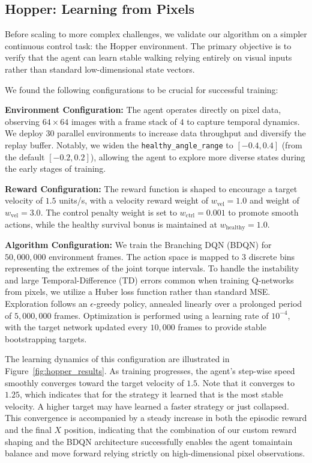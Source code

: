 \subsection{Hopper: Learning from Pixels}
\label{sec:hopper_results}

Before scaling to more complex challenges, we validate our algorithm on a simpler continuous control task: the Hopper environment. The primary objective is to verify that the agent can learn stable walking relying entirely on visual inputs rather than standard low-dimensional state vectors. 

We found the following configurations to be crucial for successful training:

\textbf{Environment Configuration:} 
The agent operates directly on pixel data, observing $64 \times 64$ images with a frame stack of $4$ to capture temporal dynamics. We deploy $30$ parallel environments to increase data throughput and diversify the replay buffer. Notably, we widen the \texttt{healthy\_angle\_range} to $[-0.4, 0.4]$ (from the default $[-0.2, 0.2]$), allowing the agent to explore more diverse states during the early stages of training.

\textbf{Reward Configuration:}
The reward function is shaped to encourage a target velocity of $1.5$ units/s, with a velocity reward weight of $w_{\text{vel}} = 1.0$ and weight of $w_{\text{vel}} = 3.0$. The control penalty weight is set to $w_{\text{ctrl}} = 0.001$ to promote smooth actions, while the healthy survival bonus is maintained at $w_{\text{healthy}} = 1.0$.

\textbf{Algorithm Configuration:} 
We train the Branching DQN (BDQN) for $50,000,000$ environment frames. The action space is mapped to $3$ discrete bins representing the extremes of the joint torque intervals. To handle the instability and large Temporal-Difference (TD) errors common when training Q-networks from pixels, we utilize a Huber loss function rather than standard MSE. Exploration follows an $\epsilon$-greedy policy, annealed linearly over a prolonged period of $5,000,000$ frames. Optimization is performed using a learning rate of $10^{-4}$, with the target network updated every $10,000$ frames to provide stable bootstrapping targets.

The learning dynamics of this configuration are illustrated in Figure~\ref{fig:hopper_results}. As training progresses, the agent's step-wise speed smoothly converges toward the target velocity of $1.5$. Note that it converges to $1.25$, which indicates that for the strategy it learned that is the most stable velocity. A higher target may have learned a faster strategy or just collapsed. This convergence is accompanied by a steady increase in both the episodic reward and the final $X$ position, indicating that the combination of our custom reward shaping and the BDQN architecture successfully enables the agent tomaintain balance and move forward relying strictly on high-dimensional pixel observations.

